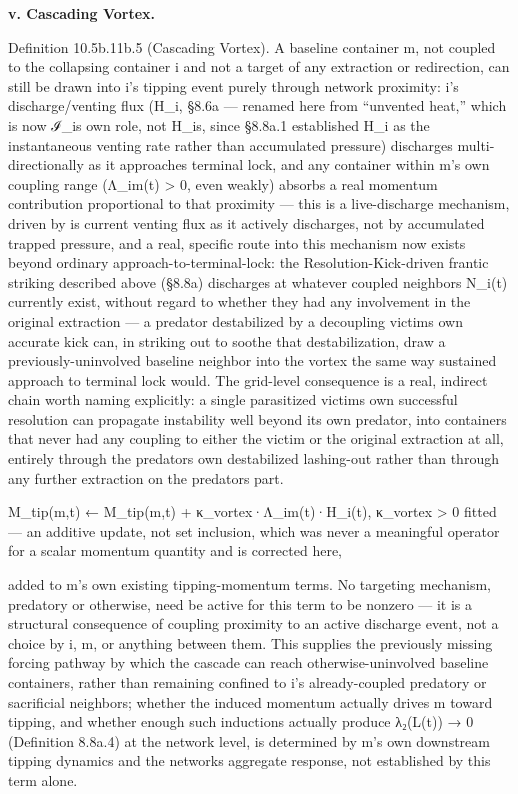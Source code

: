 \documentclass[
]{article}
\begin{document}
\textbf{v. Cascading Vortex.}

Definition 10.5b.11b.5 (Cascading Vortex). A baseline container m, not
coupled to the collapsing container i and not a target of any extraction
or redirection, can still be drawn into i's tipping event purely through
network proximity: i's discharge/venting flux (H\_i, §8.6a --- renamed
here from ``unvented heat,'' which is now ℐ\_i\textquotesingle s own
role, not H\_i\textquotesingle s, since §8.8a.1 established H\_i as the
instantaneous venting rate rather than accumulated pressure) discharges
multi-directionally as it approaches terminal lock, and any container
within m's own coupling range (Λ\_im(t) \textgreater{} 0, even weakly)
absorbs a real momentum contribution proportional to that proximity ---
this is a live-discharge mechanism, driven by i\textquotesingle s
current venting flux as it actively discharges, not by accumulated
trapped pressure, and a real, specific route into this mechanism now
exists beyond ordinary approach-to-terminal-lock: the
Resolution-Kick-driven frantic striking described above (§8.8a)
discharges at whatever coupled neighbors N\_i(t) currently exist,
without regard to whether they had any involvement in the original
extraction --- a predator destabilized by a decoupling
victim\textquotesingle s own accurate kick can, in striking out to
soothe that destabilization, draw a previously-uninvolved baseline
neighbor into the vortex the same way sustained approach to terminal
lock would. The grid-level consequence is a real, indirect chain worth
naming explicitly: a single parasitized victim\textquotesingle s own
successful resolution can propagate instability well beyond its own
predator, into containers that never had any coupling to either the
victim or the original extraction at all, entirely through the
predator\textquotesingle s own destabilized lashing-out rather than
through any further extraction on the predator\textquotesingle s part.

M\_tip(m,t) ← M\_tip(m,t) + κ\_vortex·Λ\_im(t)·H\_i(t), κ\_vortex
\textgreater{} 0 fitted --- an additive update, not set inclusion, which
was never a meaningful operator for a scalar momentum quantity and is
corrected here,

added to m's own existing tipping-momentum terms. No targeting
mechanism, predatory or otherwise, need be active for this term to be
nonzero --- it is a structural consequence of coupling proximity to an
active discharge event, not a choice by i, m, or anything between them.
This supplies the previously missing forcing pathway by which the
cascade can reach otherwise-uninvolved baseline containers, rather than
remaining confined to i's already-coupled predatory or sacrificial
neighbors; whether the induced momentum actually drives m toward
tipping, and whether enough such inductions actually produce λ₂(L(t)) →
0 (Definition 8.8a.4) at the network level, is determined by m's own
downstream tipping dynamics and the network\textquotesingle s aggregate
response, not established by this term alone.
\end{document}
